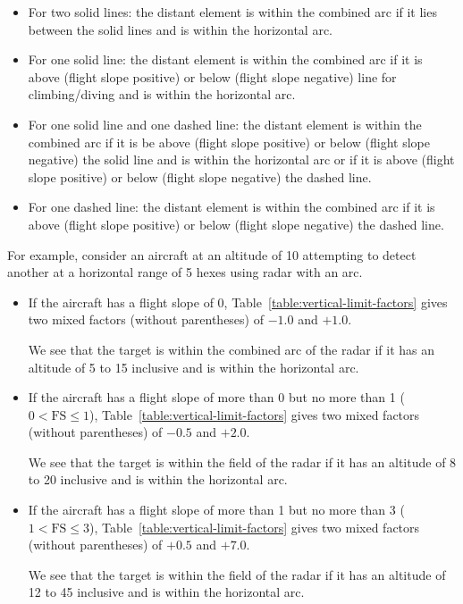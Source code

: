 {\begin{itemize}
    \item For two solid lines: the distant element is within the combined arc if it lies between the solid lines and is within the horizontal arc.
    \item For one solid line: the distant element is within the combined arc if it is above (flight slope positive) or below (flight slope negative) line for climbing/diving and is within the horizontal arc.
    \item For one solid line and one dashed line: the distant element is within the combined arc if it is be above (flight slope positive) or below (flight slope negative) the solid line and is within the horizontal arc or if it is above (flight slope positive) or below (flight slope negative) the dashed line.
    \item For one dashed line: the distant element is within the combined arc if it is above (flight slope positive) or below (flight slope negative) the dashed line.
\end{itemize}

For example, consider an aircraft at an altitude of 10 attempting to detect another at a horizontal range of 5 hexes using radar with an  arc.
\begin{itemize}
\item
If the aircraft has a flight slope of 0, Table~\ref{table:vertical-limit-factors} gives two mixed factors (without parentheses) of $-1.0$ and $+1.0$. 

We see that the target is within the combined arc of the radar if it has an altitude of 5 to 15 inclusive and is within the  horizontal arc.

\item
If the aircraft has a flight slope of more than 0 but no more than 1 ($0 < \mbox{FS} \le 1$), Table~\ref{table:vertical-limit-factors} gives two mixed factors (without parentheses) of $-0.5$ and $+2.0$. 

We see that the target is within the field of the radar if it has an altitude of 8 to 20 inclusive and is within the  horizontal arc.

\item
If the aircraft has a flight slope of more than 1 but no more than 3 ($1 < \mbox{FS} \le 3$), Table~\ref{table:vertical-limit-factors} gives two mixed factors (without parentheses) of $+0.5$ and $+7.0$. 

We see that the target is within the field of the radar if it has an altitude of 12 to 45 inclusive and is within the  horizontal arc.


\end{itemize}}
